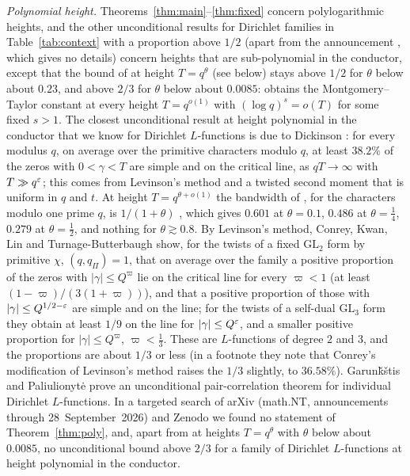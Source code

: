 \documentclass[11pt]{amsart}
\theoremstyle{definition}
\theoremstyle{remark}
\numberwithin{equation}{section}
\begin{document}
\emph{Polynomial height.} Theorems~\ref{thm:main}--\ref{thm:fixed} concern polylogarithmic heights, and the other unconditional results for Dirichlet families in Table~\ref{tab:context} with a proportion above $1/2$ (apart from the announcement \cite[Rem.~7.2]{AF26}, which gives no details) concern heights that are sub-polynomial in the conductor, except that the bound of \cite{HY26b} at height $T=q^\theta$ (see below) stays above $1/2$ for $\theta$ below about $0.23$, and above $2/3$ for $\theta$ below about $0.0085$: \cite{HY26b} obtains the Montgomery--Taylor constant at every height $T=q^{o(1)}$ with $(\log q)^s=o(T)$ for some fixed $s>1$. The closest unconditional result at height polynomial in the conductor that we know for Dirichlet $L$-functions is due to Dickinson \cite[Theorem~1.4, Corollary~1.1]{Dic24}: for every modulus $q$, on average over the primitive characters modulo $q$, at least $38.2\%$ of the zeros with $0<\gamma<T$ are simple and on the critical line, as $qT\to\infty$ with $T\gg q^{\varepsilon}$; this comes from Levinson's method and a twisted second moment that is uniform in $q$ and $t$. At height $T=q^{\theta+o(1)}$ the bandwidth of \cite{HY26b}, for the characters modulo one prime $q$, is $1/(1+\theta)$ \cite[Remark~2.4]{HY26b}, which gives $0.601$ at $\theta=0.1$, $0.486$ at $\theta=\frac14$, $0.279$ at $\theta=\frac12$, and nothing for $\theta\gtrsim0.8$. By Levinson's method, Conrey, Kwan, Lin and Turnage-Butterbaugh \cite[Corollaries~1.13, 1.14]{CKLT26} show, for the twists of a fixed $\mathrm{GL}_2$ form by primitive $\chi$, $(q,q_\Pi)=1$, that on average over the family a positive proportion of the zeros with $|\gamma|\le Q^{\varpi}$ lie on the critical line for every $\varpi<1$ (at least $(1-\varpi)/(3(1+\varpi))$), and that a positive proportion of those with $|\gamma|\le Q^{1/2-\varepsilon}$ are simple and on the line; for the twists of a self-dual $\mathrm{GL}_3$ form they obtain at least $1/9$ on the line for $|\gamma|\le Q^{\varepsilon}$, and a smaller positive proportion for $|\gamma|\le Q^\varpi$, $\varpi<\frac13$. These are $L$-functions of degree $2$ and $3$, and the proportions are about $1/3$ or less (in a footnote they note that Conrey's modification of Levinson's method raises the $1/3$ slightly, to $36.58\%$). Garun\v{k}\v{s}tis and Paliulionyt\.e \cite{GP25} prove an unconditional pair-correlation theorem for individual Dirichlet $L$-functions. In a targeted search of arXiv (math.NT, announcements through 28~September~2026) and Zenodo we found no statement of Theorem~\ref{thm:poly}, and, apart from \cite{HY26b} at heights $T=q^\theta$ with $\theta$ below about $0.0085$, no unconditional bound above $2/3$ for a family of Dirichlet $L$-functions at height polynomial in the conductor.
\end{document}
